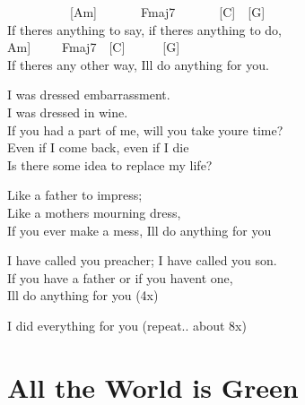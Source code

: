 \documentclass[
  letterpaper,
  twoside=false]{scrbook}
\begin{document}
~~~~~~~~~~{[}Am{]}~~~~~~~Fmaj7~~~~~~~{[}C{]}~~{[}G{]}\\
If there\textquotesingle s anything to say, if there\textquotesingle s
anything to do,\\
\hspace*{0.333em}\hspace*{0.333em}\hspace*{0.333em}\hspace*{0.333em}\hspace*{0.333em}\hspace*{0.333em}\hspace*{0.333em}\hspace*{0.333em}\hspace*{0.333em}\hspace*{0.333em}{[}Am{]}~~~~~Fmaj7~~{[}C{]}~~~~~~{[}G{]}\\
If there\textquotesingle s any other way, I\textquotesingle ll do
anything for you.

I was dressed embarrassment.\\
I was dressed in wine.\\
If you had a part of me, will you take you\textquotesingle re time?\\
Even if I come back, even if I die\\
Is there some idea to replace my life?

Like a father to impress;\\
Like a mother\textquotesingle s mourning dress,\\
If you ever make a mess, I\textquotesingle ll do anything for you

I have called you preacher; I have called you son.\\
If you have a father or if you haven\textquotesingle t one,\\
I\textquotesingle ll do anything for you (4x)

I did everything for you (repeat.. about 8x)

\hypertarget{all-the-world-is-green}{%
\chapter{All the World is Green}\label{all-the-world-is-green}}
\end{document}
